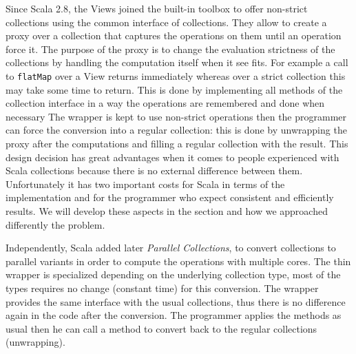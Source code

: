 \documentclass[a4paper,12pt,twocolumn]{article}
\begin{document}
Since Scala 2.8, the Views joined the built-in toolbox to offer non-strict collections using the common interface of collections.
They allow to create a proxy over a collection that captures the operations on them until an operation force it.
The purpose of the proxy is to change the evaluation strictness of the collections by handling the computation itself when it see fits.
For example a call to \verb|flatMap| over a View returns immediately whereas over a strict collection this may take some time to return.
This is done by implementing all methods of the collection interface in a way the operations are remembered and done when necessary
The wrapper is kept to use non-strict operations then the programmer can force the conversion into a regular collection: this is done by unwrapping the proxy after the computations and filling a regular collection with the result.
This design decision has great advantages when it comes to people experienced with Scala collections because there is no external difference between them.
Unfortunately it has two important costs for Scala in terms of the implementation and for the programmer who expect consistent and efficiently results.
We will develop these aspects in the section and how we approached differently the problem.

Independently, Scala added later {\it Parallel Collections}, to convert collections to parallel variants in order to compute the operations with multiple cores.
The thin wrapper is specialized depending on the underlying collection type, most of the types requires no change (constant time) for this conversion.
The wrapper provides the same interface with the usual collections, thus there is no difference again in the code after the conversion.
The programmer applies the methods as usual then he can call a method to convert back to the regular collections (unwrapping).
\end{document}

